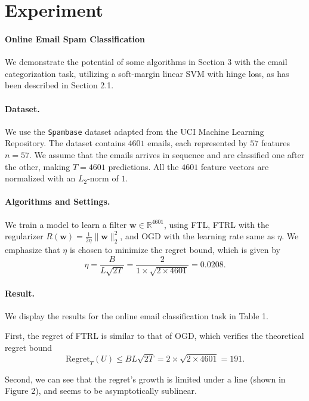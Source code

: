 \documentclass{article}
\begin{document}
\section{Experiment}

\paragraph{Online Email Spam Classification} We demonstrate the potential of some algorithms in Section 3 with the email categorization task, utilizing a soft-margin linear SVM with hinge loss, as has been described in Section 2.1.

\paragraph{Dataset.} We use the \texttt{Spambase} dataset adapted from the UCI Machine Learning Repository. The dataset contains $4601$ emails, each represented by $57$ features $n=57$. We assume that the emails arrives in sequence and are classified one after the other, making $T=4601$ predictions. All the $4601$ feature vectors are normalized with an $L_2$-norm of $1$.

\paragraph{Algorithms and Settings.} We train a model to learn a filter $\textbf{w}\in \mathbb{R}^{4601}$, using FTL, FTRL with the regularizer $R(\textbf{w})=\frac{1}{2\eta}\lVert \textbf{w}\rVert_2^2$, and OGD with the learning rate same as $\eta$. We emphasize that $\eta$ is chosen to minimize the regret bound, which is given by $$\eta=\frac{B}{L\sqrt{2T}}=\frac{2}{1\times \sqrt{2\times 4601}}=0.0208.$$

\paragraph{Result.} We display the results for the online email classification task in Table 1.

First, the regret of FTRL is similar to that of OGD, which verifies the theoretical regret bound $$\text{Regret}_T(U)\leq BL\sqrt{2T}=2\times\sqrt{2\times 4601}=191.$$

Second, we can see that the regret's growth is limited under a line (shown in Figure 2), and seems to be asymptotically sublinear.
\end{document}
